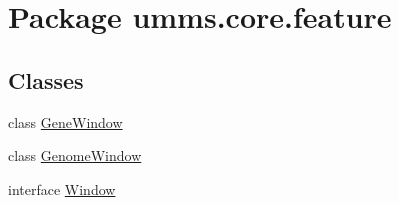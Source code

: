 \hypertarget{namespaceumms_1_1core_1_1feature}{\section{Package umms.\+core.\+feature}
\label{namespaceumms_1_1core_1_1feature}
}
\subsection*{Classes}
\begin{DoxyCompactItemize}
\item 
class \hyperlink{classumms_1_1core_1_1feature_1_1_gene_window}{Gene\+Window}
\item 
class \hyperlink{classumms_1_1core_1_1feature_1_1_genome_window}{Genome\+Window}
\item 
interface \hyperlink{interfaceumms_1_1core_1_1feature_1_1_window}{Window}
\end{DoxyCompactItemize}
